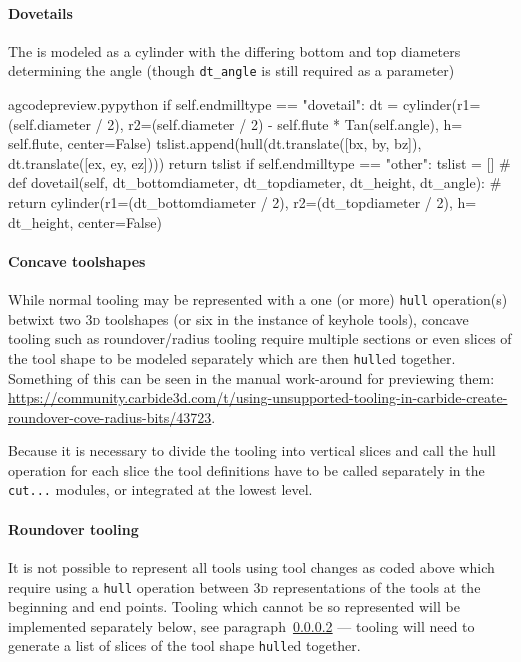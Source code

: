 \documentclass{ltxdoc}
\begin{document}
\paragraph{Dovetails}

\label{subpara:dovetails}The  is modeled as a cylinder with the differing bottom and top diameters determining the angle (though \verb|dt_angle| is still required as a parameter)

\lstset{firstnumber=\thegcpy}
\begin{writecode}{a}{gcodepreview.py}{python}
        if self.endmilltype == "dovetail":
            dt = cylinder(r1=(self.diameter / 2), r2=(self.diameter / 2) - self.flute * Tan(self.angle), h= self.flute, center=False)
            tslist.append(hull(dt.translate([bx, by, bz]), dt.translate([ex, ey, ez])))
            return tslist
        if self.endmilltype == "other":
            tslist = []
#    def dovetail(self, dt_bottomdiameter, dt_topdiameter, dt_height, dt_angle):
#        return cylinder(r1=(dt_bottomdiameter / 2), r2=(dt_topdiameter / 2), h= dt_height, center=False)

\end{writecode}
\addtocounter{gcpy}{3}


\paragraph{Concave toolshapes}
\label{para:concavetoolshapes} 
While normal tooling may be represented with a one (or more) \texttt{hull} operation(s) betwixt two \textsc{3d} toolshapes (or six in the instance of keyhole tools), concave tooling such as roundover/radius tooling require multiple sections or even slices of the tool shape to be modeled separately which are then \texttt{hull}ed together. Something of this can be seen in the manual work-around for previewing them: \url{https://community.carbide3d.com/t/using-unsupported-tooling-in-carbide-create-roundover-cove-radius-bits/43723}.

Because it is necessary to divide the tooling into vertical slices and call the hull operation for each slice the tool definitions have to be called separately in the \verb|cut...| modules, or integrated at the lowest level.

\paragraph{Roundover tooling}

\label{para:roundover} It is not possible to represent all tools using tool changes as coded above which require using a \texttt{hull} operation between \textsc{3d} representations of the tools at the beginning and end points. Tooling which cannot be so represented will be implemented separately below, see paragraph~\ref{para:concavetoolshapes} ---  tooling will need to generate a list of slices of the tool shape \verb|hull|ed together.
\end{document}
